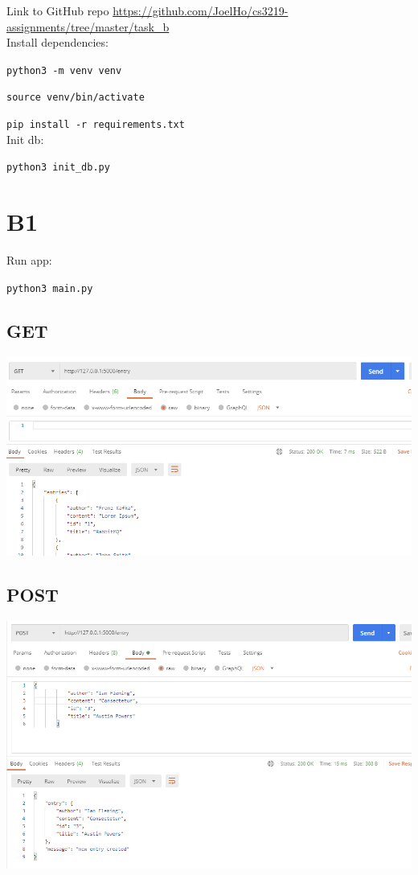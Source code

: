\documentclass{article}
\begin{document}
    Link to GitHub repo \href{https://github.com/JoelHo/cs3219-assignments/tree/master/task_b}{https://github.com/JoelHo/cs3219-assignments/tree/master/task\_b}\\

    Install dependencies:

    \texttt{python3 -m venv venv}

    \texttt{source venv/bin/activate}

    \texttt{pip install -r requirements.txt}\\

    Init db:

    \texttt{python3 init\_db.py}\\

    \section*{B1}
    Run app:

    \texttt{python3 main.py}\\

    \subsection*{GET}

    \includegraphics[width=\textwidth]{img/get.png}\\

    \subsection*{POST}

    \includegraphics[width=\textwidth]{img/post.png}\\
\end{document}
